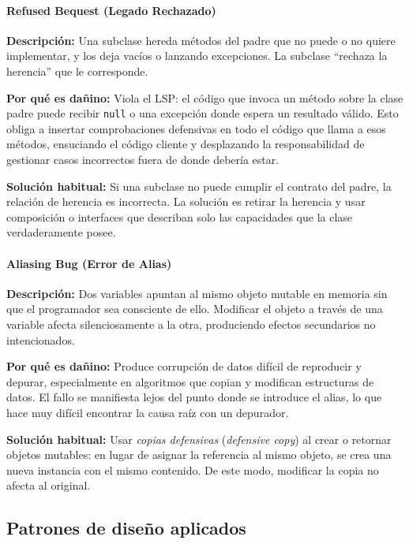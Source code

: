 \documentclass[11pt,a4paper]{article}
\newcommand{\code}[1]{\texttt{#1}}
\begin{document}
\label{sec:fund-refused-bequest}
\paragraph{Refused Bequest (Legado Rechazado)}

\textbf{Descripción:} Una subclase hereda métodos del padre que no puede o no
quiere implementar, y los deja vacíos o lanzando excepciones.  La subclase
``rechaza la herencia'' que le corresponde.

\textbf{Por qué es dañino:} Viola el LSP: el código que invoca un método sobre
la clase padre puede recibir \code{null} o una excepción donde espera un
resultado válido.  Esto obliga a insertar comprobaciones defensivas en todo el
código que llama a esos métodos, ensuciando el código cliente y desplazando la
responsabilidad de gestionar casos incorrectos fuera de donde debería estar.

\textbf{Solución habitual:} Si una subclase no puede cumplir el contrato del
padre, la relación de herencia es incorrecta.  La solución es retirar la herencia
y usar composición o interfaces que describan solo las capacidades que la clase
verdaderamente posee.

\label{sec:fund-alias-bug}
\paragraph{Aliasing Bug (Error de Alias)}

\textbf{Descripción:} Dos variables apuntan al mismo objeto mutable en memoria
sin que el programador sea consciente de ello.  Modificar el objeto a través de
una variable afecta silenciosamente a la otra, produciendo efectos secundarios
no intencionados.

\textbf{Por qué es dañino:} Produce corrupción de datos difícil de reproducir
y depurar, especialmente en algoritmos que copian y modifican estructuras de
datos.  El fallo se manifiesta lejos del punto donde se introduce el alias, lo
que hace muy difícil encontrar la causa raíz con un depurador.

\textbf{Solución habitual:} Usar \emph{copias defensivas} (\emph{defensive
copy}) al crear o retornar objetos mutables: en lugar de asignar la referencia
al mismo objeto, se crea una nueva instancia con el mismo contenido.  De este
modo, modificar la copia no afecta al original.

\subsection{Patrones de diseño aplicados}
\label{sec:fund-patrones}
\end{document}
